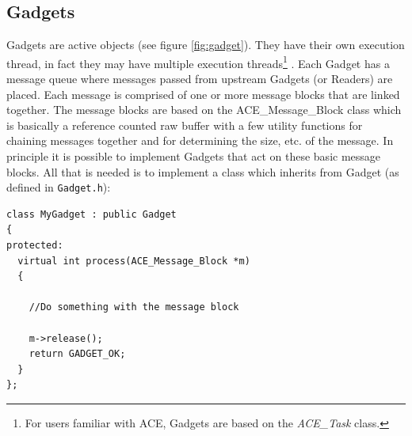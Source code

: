 \documentclass[11pt]{article}
\begin{document}
\subsection{Gadgets}
\label{section:gadgets}
Gadgets are active objects (see figure \ref{fig:gadget}). They have their own execution thread, in fact they may have multiple execution threads\footnote{For users familiar with ACE, Gadgets are based on the \emph{ACE\_Task} class.} . Each Gadget has a message queue where messages passed from upstream Gadgets (or Readers) are placed. Each message is comprised of one or more message blocks that are linked together. The message blocks are based on the ACE\_Message\_Block class which is basically a reference counted raw buffer with a few utility functions for chaining messages together and for determining the size, etc. of the message. In principle it is possible to implement Gadgets that act on these basic message blocks. All that is needed is to implement a class which inherits from Gadget (as defined in \texttt{Gadget.h}):

{\scriptsize 
\begin{verbatim}
class MyGadget : public Gadget
{
protected:
  virtual int process(ACE_Message_Block *m)
  {
    
    //Do something with the message block
    
    m->release();
    return GADGET_OK;
  }
};
\end{verbatim}}
\end{document}

